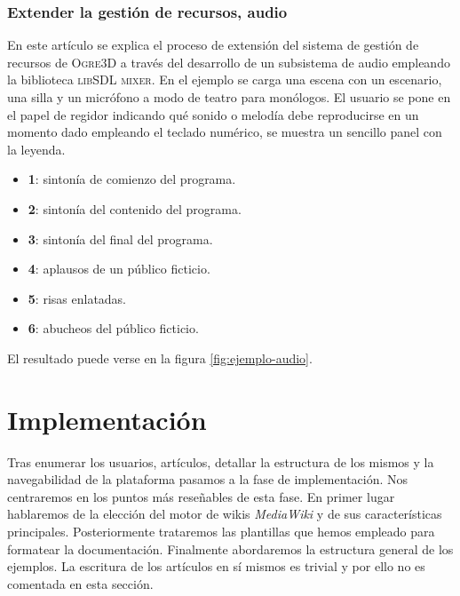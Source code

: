 \subsubsection{Extender la gestión de recursos, audio}

En este artículo se explica el proceso de extensión del sistema de gestión
de recursos de \textsc{Ogre3D} a través del desarrollo de un subsistema
de audio empleando la biblioteca \textsc{libSDL mixer}. En el ejemplo
se carga una escena con un escenario, una silla y un micrófono a modo
de teatro para monólogos. El usuario se pone en el papel de regidor
indicando qué sonido o melodía debe reproducirse en un momento dado empleando
el teclado numérico, se muestra un sencillo panel con la leyenda.

\begin{itemize}
    \itemsep0em
    \item \textbf{1}: sintonía de comienzo del programa.
    \item \textbf{2}: sintonía del contenido del programa.
    \item \textbf{3}: sintonía del final del programa.
    \item \textbf{4}: aplausos de un público ficticio.
    \item \textbf{5}: risas enlatadas.
    \item \textbf{6}: abucheos del público ficticio.
\end{itemize}

El resultado puede verse en la figura \ref{fig:ejemplo-audio}.\\



\section{Implementación}

Tras enumerar los usuarios, artículos, detallar la estructura de los mismos
y la navegabilidad de la plataforma pasamos a la fase de implementación.
Nos centraremos en los puntos más reseñables de esta fase. En primer lugar
hablaremos de la elección del motor de wikis \textit{MediaWiki} y de sus
características principales. Posteriormente trataremos las plantillas que
hemos empleado para formatear la documentación. Finalmente abordaremos
la estructura general de los ejemplos. La escritura de los artículos 
en sí mismos es trivial y por ello no es comentada en esta sección.\\

